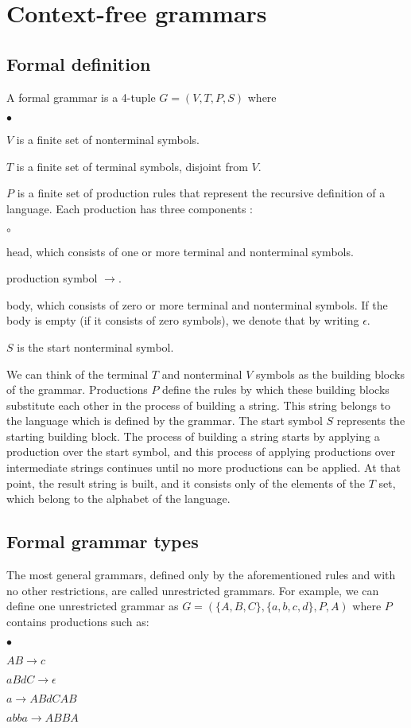 \section{Context-free grammars}
\subsection{Formal definition}
A formal grammar is a 4-tuple $G = (V, T, P, S)$ \citep{sipser2013introduction} where
\begin{list}{$\bullet$}{}  	
	\item $V$ is a finite set of nonterminal symbols.
	\item $T$ is a finite set of terminal symbols, disjoint from $V$.
	\item $P$ is a finite set of production rules that represent the recursive definition of a language. Each production has three components \citep{hopcroft2007automatatheory}:
		\begin{list}{$\circ$}{}
			\item head, which consists of one or more terminal and nonterminal symbols.
			\item production symbol $\rightarrow$.
			\item body, which consists of zero or more terminal and nonterminal symbols. If the body is empty (if it consists of zero symbols), we denote that by writing $\epsilon$.
		\end{list}
	\item $S$ is the start nonterminal symbol.
\end{list}

We can think of the terminal $T$ and nonterminal $V$ symbols as the building blocks of the grammar. Productions $P$ define the rules by which these building blocks substitute each other in the process of building a string. This string belongs to the language which is defined by the grammar. The start symbol $S$ represents the starting building block. The process of building a string starts by applying a production over the start symbol, and this process of applying productions over intermediate strings continues until no more productions can be applied. At that point, the result string is built, and it consists only of the elements of the $T$ set, which belong to the alphabet of the language.

\subsection{Formal grammar types}
The most general grammars, defined only by the aforementioned rules and with no other restrictions, are called unrestricted grammars. For example, we can define one unrestricted grammar as $G = (\{A, B, C\}, \{a, b, c, d\}, P, A)$ where $P$ contains productions such as:
\begin{list}{$\bullet$}{}  	
	\item $AB \rightarrow c$
	\item $aBdC \rightarrow \epsilon$
	\item $a \rightarrow ABdCAB$
	\item $abba \rightarrow ABBA$
\end{list}

